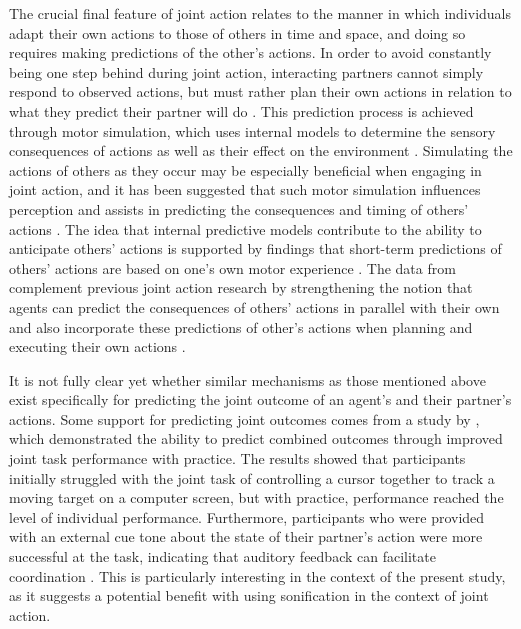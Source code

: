 \documentclass[10pt,a4paper,onecolumn]{article}
\begin{document}
The crucial final feature of joint action relates to the manner in which individuals adapt their own actions to those of others in time and space, and doing so requires making predictions of the other's actions. In order to avoid constantly being one step behind during joint action, interacting partners cannot simply respond to observed actions, but must rather plan their own actions in relation to what they predict their partner will do \autocite{sebanzJointActionBodies2006}. This prediction process is achieved through motor simulation, which uses internal models to determine the sensory consequences of actions as well as their effect on the environment \autocite{schmitzSoundJoinedActions2017,vesperMinimalArchitectureJoint2010}. Simulating the actions of others as they occur may be especially beneficial when engaging in joint action, and it has been suggested that such motor simulation influences perception and assists in predicting the consequences and timing of others' actions \autocite{vesperMinimalArchitectureJoint2010}. The idea that internal predictive models contribute to the ability to anticipate others' actions is supported by findings that short-term predictions of others' actions are based on one's own motor experience \autocite{agliotiActionAnticipationMotor2008,calvo-merinoActionObservationAcquired2005}. The data from \textcite{loehrSoundYouMe2016} complement previous joint action research by strengthening the notion that agents can predict the consequences of others' actions in parallel with their own \autocite{loehrMonitoringIndividualJoint2013,vandersteenADaptationAnticipationModel2013,vesperOurActionsMy2014,wolpertUnifyingComputationalFramework2003} and also incorporate these predictions of other's actions when planning and executing their own actions \autocite{knoblichActionCoordinationGroups2003,kourtisPredictiveRepresentationOther2012,loehrTemporalCoordinationPerforming2011,vesperAreYouReady2013}.

It is not fully clear yet whether similar mechanisms as those mentioned above exist specifically for predicting the joint outcome of an agent's and their partner's actions. Some support for predicting joint outcomes comes from a study by \textcite{knoblichActionCoordinationGroups2003}, which demonstrated the ability to predict combined outcomes through improved joint task performance with practice. The results showed that participants initially struggled with the joint task of controlling a cursor together to track a moving target on a computer screen, but with practice, performance reached the level of individual performance. Furthermore, participants who were provided with an external cue tone about the state of their partner's action were more successful at the task, indicating that auditory feedback can facilitate coordination \autocite{knoblichActionCoordinationGroups2003}. This is particularly interesting in the context of the present study, as it suggests a potential benefit with using sonification in the context of joint action.
\end{document}
